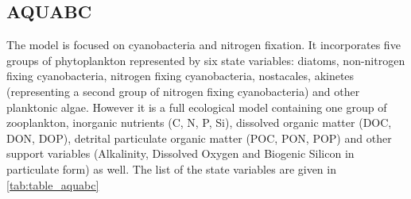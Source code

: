 
%
%
%
%
%
%
%
\newcommand{\Ttwoa}{\ref{FuncDesc}}
\subsection{AQUABC}
The model is focused on cyanobacteria and nitrogen fixation. It incorporates five groups of phytoplankton represented by six state variables: diatoms, non-nitrogen fixing cyanobacteria, nitrogen fixing cyanobacteria, nostacales, akinetes (representing a second group of nitrogen fixing cyanobacteria) and other planktonic algae. However it is a full ecological model containing one group of zooplankton, inorganic nutrients (C, N, P, Si), dissolved organic matter (DOC, DON, DOP), detrital particulate organic matter (POC, PON, POP) and other support variables (Alkalinity, Dissolved Oxygen and Biogenic Silicon in particulate form) as well. The list of the state variables are given in \ref{tab:table_aquabc}

